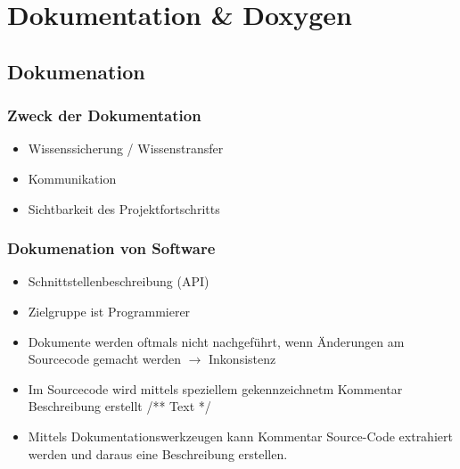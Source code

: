 \section{Dokumentation \& Doxygen}
\subsection{Dokumenation}
\subsubsection{Zweck der Dokumentation}
\begin{itemize}
	\item Wissenssicherung / Wissenstransfer
	\item Kommunikation
	\item Sichtbarkeit des Projektfortschritts
\end{itemize}
\subsubsection{Dokumenation von Software}
\begin{itemize}
	\item Schnittstellenbeschreibung (API)
	\item Zielgruppe ist Programmierer
	\item Dokumente werden oftmals nicht nachgeführt, wenn Änderungen am Sourcecode gemacht werden $\rightarrow$ Inkonsistenz
	\item Im Sourcecode wird mittels speziellem gekennzeichnetm Kommentar Beschreibung erstellt /** Text */
	\item Mittels Dokumentationswerkzeugen kann Kommentar Source-Code extrahiert werden und daraus eine Beschreibung erstellen.  
\end{itemize}

